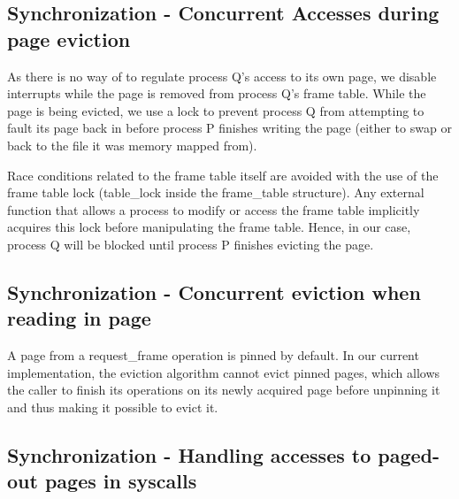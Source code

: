 
\subsection{Synchronization - Concurrent Accesses during page eviction}

As there is no way of to regulate process Q's access to its own page, we disable interrupts while the page is removed from process Q's frame table.
While the page is being evicted, we use a lock to prevent process Q from attempting to fault its page back in before process P finishes writing the page (either to swap or back to the file it was memory mapped from).

Race conditions related to the frame table itself are avoided with the use of the frame table lock (table_lock inside the frame_table structure).
Any external function that allows a process to modify or access the frame table implicitly acquires this lock before manipulating the frame table.
Hence, in our case, process Q will be blocked until process P finishes evicting the page.

\subsection{Synchronization - Concurrent eviction when reading in page}

A page from a request_frame operation is pinned by default.
In our current implementation, the eviction algorithm cannot evict pinned pages, which allows the caller to finish its operations on its newly acquired page before unpinning it and thus making it possible to evict it.

\subsection{Synchronization - Handling accesses to paged-out pages in syscalls}

